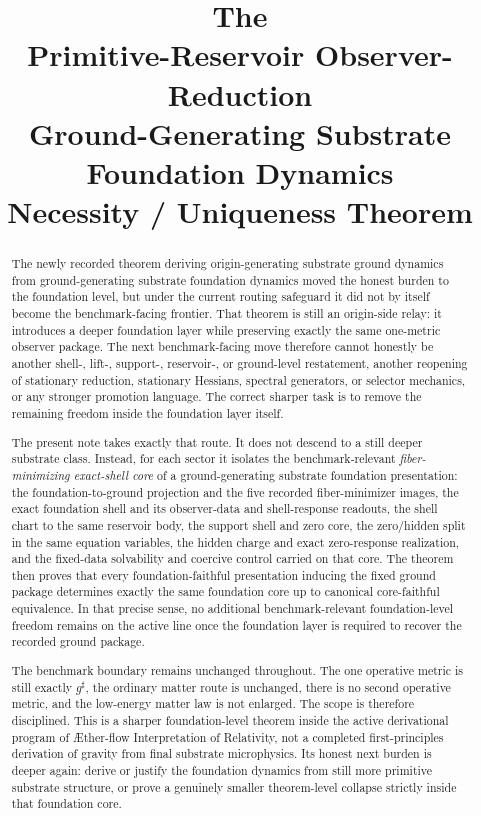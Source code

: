 \documentclass[11pt]{article}
\title{\textbf{The \TheoryName{}}\\[0.4em]
\large Primitive-Reservoir Observer-Reduction\\
\large Ground-Generating Substrate Foundation Dynamics\\
\large Necessity / Uniqueness Theorem}
\author{}
\date{}
\newcommand{\Aflow}{\AE{}ther-flow}
\newcommand{\TheoryName}{\Aflow{} Interpretation of Relativity}
\newcommand{\CompletedMetric}{g^{\sharp}}
\begin{document}
\maketitle

\begin{abstract}
The newly recorded theorem deriving origin-generating substrate ground dynamics from ground-generating substrate foundation dynamics moved the honest burden to the foundation level, but under the current routing safeguard it did not by itself become the benchmark-facing frontier. That theorem is still an origin-side relay: it introduces a deeper foundation layer while preserving exactly the same one-metric observer package. The next benchmark-facing move therefore cannot honestly be another shell-, lift-, support-, reservoir-, or ground-level restatement, another reopening of stationary reduction, stationary Hessians, spectral generators, or selector mechanics, or any stronger promotion language. The correct sharper task is to remove the remaining freedom inside the foundation layer itself.

The present note takes exactly that route. It does not descend to a still deeper substrate class. Instead, for each sector it isolates the benchmark-relevant \emph{fiber-minimizing exact-shell core} of a ground-generating substrate foundation presentation: the foundation-to-ground projection and the five recorded fiber-minimizer images, the exact foundation shell and its observer-data and shell-response readouts, the shell chart to the same reservoir body, the support shell and zero core, the zero/hidden split in the same equation variables, the hidden charge and exact zero-response realization, and the fixed-data solvability and coercive control carried on that core. The theorem then proves that every foundation-faithful presentation inducing the fixed ground package determines exactly the same foundation core up to canonical core-faithful equivalence. In that precise sense, no additional benchmark-relevant foundation-level freedom remains on the active line once the foundation layer is required to recover the recorded ground package.

The benchmark boundary remains unchanged throughout. The one operative metric is still exactly \(\CompletedMetric\), the ordinary matter route is unchanged, there is no second operative metric, and the low-energy matter law is not enlarged. The scope is therefore disciplined. This is a sharper foundation-level theorem inside the active derivational program of \TheoryName{}, not a completed first-principles derivation of gravity from final substrate microphysics. Its honest next burden is deeper again: derive or justify the foundation dynamics from still more primitive substrate structure, or prove a genuinely smaller theorem-level collapse strictly inside that foundation core.
\end{abstract}
\end{document}
